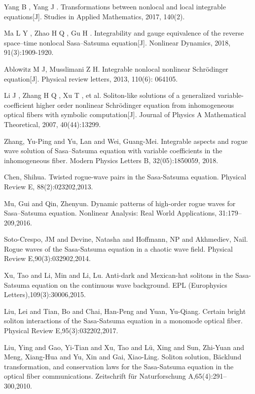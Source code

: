 \documentclass[12pt]{article}
\begin{document}
\begin{thebibliography}{19}

Yang B , Yang J . Transformations between nonlocal and local integrable equations[J]. Studies in Applied Mathematics, 2017, 140(2).

Ma L Y , Zhao H Q , Gu H . Integrability and gauge equivalence of the reverse space–time nonlocal Sasa–Satsuma equation[J]. Nonlinear Dynamics, 2018, 91(3):1909-1920.

Ablowitz M J, Musslimani Z H. Integrable nonlocal nonlinear Schrödinger equation[J]. Physical review letters, 2013, 110(6): 064105.

Li J , Zhang H Q , Xu T , et al. Soliton-like solutions of a generalized variable-coefficient higher order nonlinear Schrödinger equation from inhomogeneous optical fibers with symbolic computation[J]. Journal of Physics A Mathematical Theoretical, 2007, 40(44):13299.

Zhang, Yu-Ping and Yu, Lan and Wei, Guang-Mei. Integrable aspects and rogue wave solution of Sasa--Satsuma equation with variable coefficients in the inhomogeneous fiber. Modern Physics Letters B, 32(05):1850059, 2018.

Chen, Shihua. Twisted rogue-wave pairs in the Sasa-Satsuma equation. Physical Review E, 88(2):023202,2013.

Mu, Gui and Qin, Zhenyun. Dynamic patterns of high-order rogue waves for Sasa--Satsuma equation. Nonlinear Analysis: Real World Applications, 31:179--209,2016.

Soto-Crespo, JM and Devine, Natasha and Hoffmann, NP and Akhmediev, Nail. Rogue waves of the Sasa-Satsuma equation in a chaotic wave field. Physical Review E,90(3):032902,2014.

Xu, Tao and Li, Min and Li, Lu. Anti-dark and Mexican-hat solitons in the Sasa-Satsuma equation on the continuous wave background. EPL (Europhysics Letters),109(3):30006,2015.

Liu, Lei and Tian, Bo and Chai, Han-Peng and Yuan, Yu-Qiang. Certain bright soliton interactions of the Sasa-Satsuma equation in a monomode optical fiber. Physical Review E,95(3):032202,2017.

Liu, Ying and Gao, Yi-Tian and Xu, Tao and L{\"u}, Xing and Sun, Zhi-Yuan and Meng, Xiang-Hua and Yu, Xin and Gai, Xiao-Ling. Soliton solution, B{\"a}cklund transformation, and conservation laws for the Sasa-Satsuma equation in the optical fiber communications. Zeitschrift f{\"u}r Naturforschung A,65(4):291--300,2010.


\end{thebibliography}
\end{document}
